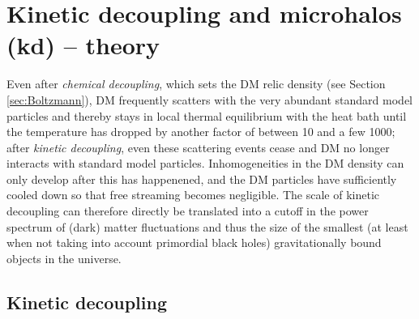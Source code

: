\section{Kinetic decoupling and microhalos (kd) -- theory}
\label{sec:kd}


Even after \emph{chemical decoupling}, which sets the DM relic density (see Section 
\ref{sec:Boltzmann}), DM  frequently scatters with the very abundant 
standard model particles and thereby stays in local thermal equilibrium with the 
heat bath until the temperature has dropped by another factor of between 10 and
 a few 1000; after \emph{kinetic decoupling}, even these scattering events cease and DM 
no longer interacts with standard model particles. Inhomogeneities 
in the DM density can only develop after this has happenened, and the DM particles have
sufficiently cooled down so that free streaming becomes negligible.
The scale of kinetic decoupling can therefore directly be translated 
into a cutoff in the power spectrum of (dark) matter fluctuations and thus the size of the 
smallest (at least when not taking into account primordial black holes) gravitationally 
bound objects in the universe.



\subsection{Kinetic decoupling}

